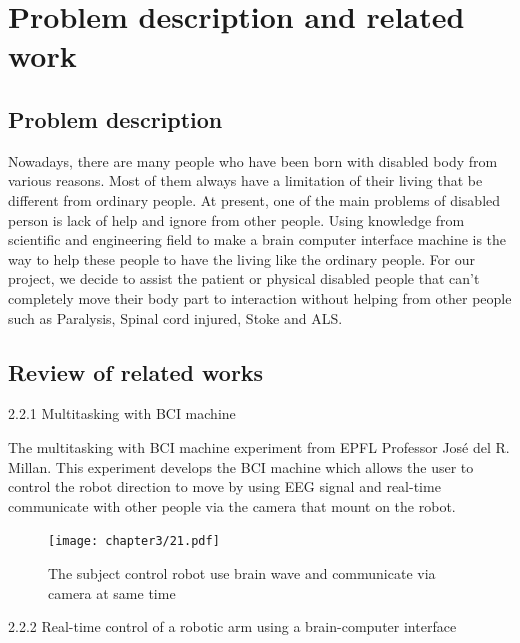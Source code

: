\chapter{Problem description and related work}

\label{ch:Problem description and related work}

\setlength{\parindent}{4em}
\setlength{\parskip}{1em}
\renewcommand{\baselinestretch}{1.5}

\section{Problem description}
\hspace{1.5cm} Nowadays, there are many people who have been born with disabled body from various reasons. Most of them always have a limitation of their living that be different from ordinary people. At present, one of the main problems of disabled person is lack of help and ignore from other people. Using knowledge from scientific and engineering field to make a brain computer interface machine is the way to help these people to have the living like the ordinary people. For our project, we decide to assist the patient or physical disabled people that can't completely move their body part to interaction without helping from other people such as Paralysis, Spinal cord injured, Stoke and ALS.

\section{Review of related works}
\hspace{1.5cm} 2.2.1 Multitasking with BCI machine\cite{tow}

The multitasking with BCI machine experiment from EPFL Professor José del R. Millan. This experiment develops the BCI machine which allows the user to control the robot direction to move by using EEG signal and real-time communicate with other people via the camera that mount on the robot.
\begin{figure}[h]
	\centering
  	\texttt{[image: chapter3/21.pdf]}
  	\caption{The subject control robot use brain wave and communicate via camera at same time}
\end{figure}

2.2.2 Real-time control of a robotic arm using a brain-computer interface\cite{asy}

